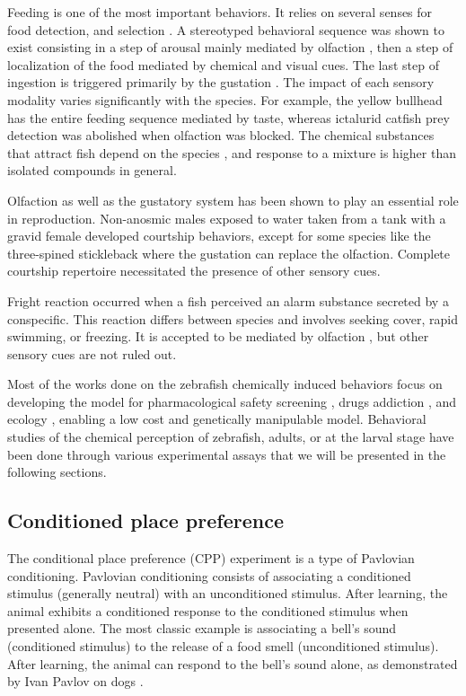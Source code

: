     Feeding is one of the most important behaviors. It relies on several senses for food detection, and selection \cite{pavlov1990sensory}. A stereotyped behavioral sequence was shown to exist \cite{atema1980chemical} consisting in a step of arousal mainly mediated by olfaction \cite{bateson1890sense}, then a step of localization of the food mediated by chemical and visual cues. The last step of ingestion is triggered primarily by the gustation \cite{atema1980chemical}. The impact of each sensory modality varies significantly with the species. For example, the yellow bullhead has the entire feeding sequence mediated by taste, whereas ictalurid catfish prey detection was abolished when olfaction was blocked. The chemical substances that attract fish depend on the species \cite{atema1980chemical}, and response to a mixture is higher than isolated compounds in general.

    Olfaction \cite{tavolga1956visual} as well as the gustatory system \cite{de1983influence} has been shown to play an essential role in reproduction. Non-anosmic males exposed to water taken from a tank with a gravid female developed courtship behaviors, except for some species like the three-spined stickleback where the gustation can replace the olfaction. Complete courtship repertoire necessitated the presence of other sensory cues.

    Fright reaction occurred when a fish perceived an alarm substance secreted by a conspecific. This reaction differs between species and involves seeking cover, rapid swimming, or freezing. It is accepted to be mediated by olfaction \cite{frisch1942schreckstoff,speedie2008alarm,doving2009alarm}, but other sensory cues are not ruled out.

    Most of the works done on the zebrafish chemically induced behaviors focus on developing the model for pharmacological safety screening \cite{cassar2019use}, drugs addiction \cite{klee2012zebrafish}, and ecology \cite{dai2014zebrafish}, enabling a low cost and genetically manipulable model. Behavioral studies of the chemical perception of zebrafish, adults, or at the larval stage have been done through various experimental assays that we will be presented in the following sections.

    \subsection{Conditioned place preference}
    The conditional place preference (CPP) experiment is a type of Pavlovian conditioning. Pavlovian conditioning consists of associating a conditioned stimulus (generally neutral) with an unconditioned stimulus. After learning, the animal exhibits a conditioned response to the conditioned stimulus when presented alone. The most classic example is associating a bell's sound (conditioned stimulus) to the release of a food smell (unconditioned stimulus). After learning, the animal can respond to the bell's sound alone, as demonstrated by Ivan Pavlov on dogs \cite{pavlov1903experimental}.

